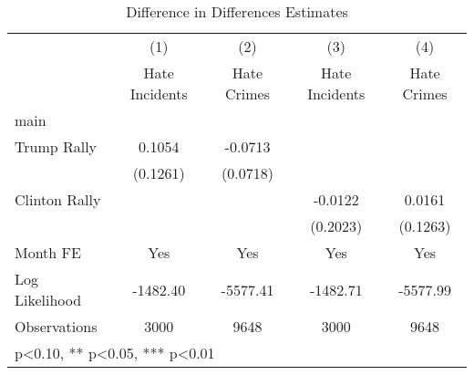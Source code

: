 \begin{table}[htbp]\centering
\def\sym#1{\ifmmode^{#1}\else\(^{#1}\)\fi}
\caption{Difference in Differences Estimates}
\begin{tabular}{l*{4}{c}}
\hline\hline
                    &\multicolumn{1}{c}{(1)}   &\multicolumn{1}{c}{(2)}   &\multicolumn{1}{c}{(3)}   &\multicolumn{1}{c}{(4)}   \\
                    &Hate Incidents   & Hate Crimes   &Hate Incidents   & Hate Crimes   \\
\hline
main                &               &               &               &               \\
Trump Rally         &      0.1054   &     -0.0713   &               &               \\
                    &    (0.1261)   &    (0.0718)   &               &               \\
Clinton Rally       &               &               &     -0.0122   &      0.0161   \\
                    &               &               &    (0.2023)   &    (0.1263)   \\
Month FE            &         Yes   &         Yes   &         Yes   &         Yes   \\
\hline
Log Likelihood      &    -1482.40   &    -5577.41   &    -1482.71   &    -5577.99   \\
Observations        &        3000   &        9648   &        3000   &        9648   \\
\hline\hline
\multicolumn{5}{l}{\footnotesize * p<0.10, ** p<0.05, *** p<0.01}\\
\end{tabular}
\end{table}

